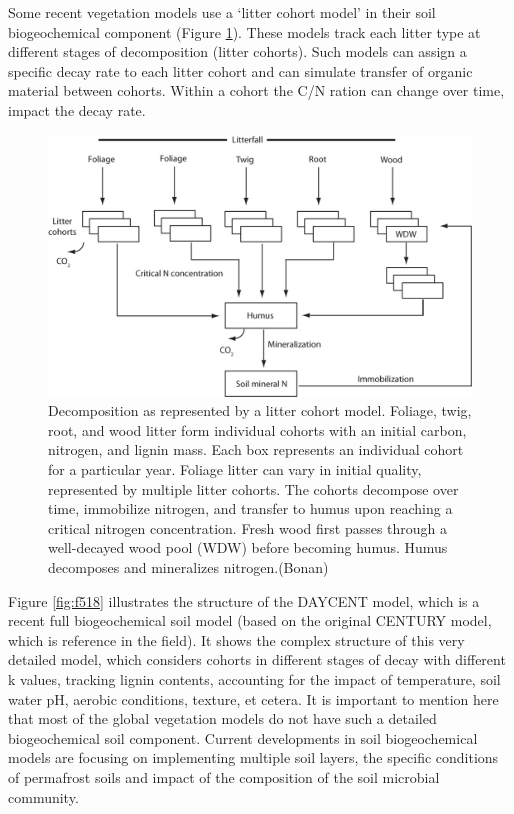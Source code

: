 \documentclass[12pt,oneside]{book}
\begin{document}
Some recent vegetation models use a `litter cohort model' in their soil
biogeochemical component (Figure \ref{fig:f517}). These models track
each litter type at different stages of decomposition (litter cohorts).
Such models can assign a specific decay rate to each litter cohort and
can simulate transfer of organic material between cohorts. Within a
cohort the C/N ration can change over time, impact the decay rate.

\begin{figure}

{\centering \includegraphics[width=0.8\linewidth]{figures/chap5/f517_litter_cohort} 

}

\caption{Decomposition as represented by a litter cohort model. Foliage, twig, root, and wood litter form individual cohorts with an initial carbon, nitrogen, and lignin mass. Each box represents an individual cohort for a particular year. Foliage litter can vary in initial quality, represented by multiple litter cohorts. The cohorts decompose over time, immobilize nitrogen, and transfer to humus upon reaching a critical nitrogen concentration. Fresh wood first passes through a well-decayed wood pool (WDW) before becoming humus. Humus decomposes and mineralizes nitrogen.(Bonan)}\label{fig:f517}
\end{figure}

Figure \ref{fig:f518} illustrates the structure of the DAYCENT model,
which is a recent full biogeochemical soil model (based on the original
CENTURY model, which is reference in the field). It shows the complex
structure of this very detailed model, which considers cohorts in
different stages of decay with different k values, tracking lignin
contents, accounting for the impact of temperature, soil water pH,
aerobic conditions, texture, et cetera. It is important to mention here
that most of the global vegetation models do not have such a detailed
biogeochemical soil component. Current developments in soil
biogeochemical models are focusing on implementing multiple soil layers,
the specific conditions of permafrost soils and impact of the
composition of the soil microbial community.
\end{document}
